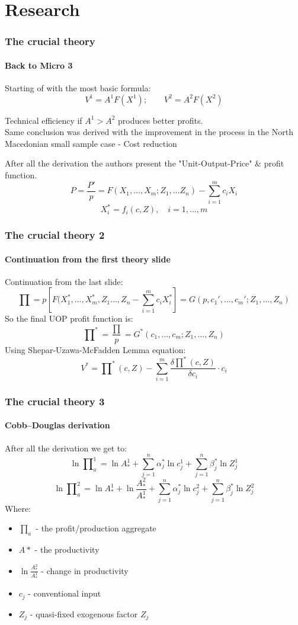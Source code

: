 \documentclass{beamer} %
\theoremstyle{definition}
\begin{document}
	\section{Research}
	\begin{frame}[fragile]
		\frametitle{The crucial theory}
		\framesubtitle{Back to Micro 3}
		Starting of with the most basic formula:
		$$ V^1 = A^1F(X^1); \qquad V^2 = A^2F(X^2) $$
		\begin{center}
			Technical efficiency if $A^1 > A^2$ produces better profits.\\
			 {\tiny Same conclusion was derived with the improvement in the process in the North Macedonian small sample case - Cost reduction}
		\end{center}
		After all the derivation the authors present the "Unit-Output-Price" \& profit function.
		$$ P = \frac{P'}{p} = F(X_1,\hdots, X_m; Z_1, \hdots Z_n) - \sum_{i=1}^{m} c_iX_i $$ 
		$$ X_i^{*} = f_i(c,Z), \quad i = 1, \hdots, m$$
		
		
	\end{frame}
	
	\begin{frame}[fragile]
		\frametitle{The crucial theory 2 }
		\framesubtitle{Continuation from the first theory slide}
		Continuation from the last slide:
		$$ \prod = p\left[F(X_1^*, \hdots , X_m^*, Z_1 \hdots, Z_n - \sum_{i=1}^{m} c_iX_i^*  \right] = G(p,c_1', \hdots, c_m';Z_1, \hdots, Z_n) $$
		So the final UOP profit function is:
		$$ \prod\nolimits^* = \frac{\prod}{p} = G^*(c_1, \hdots, c_m; Z_1, \hdots, Z_n)$$
		Using Shepar-Uzawa-McFadden Lemma equation:
		$$ V^* = \prod\nolimits^*(c,Z) - \sum_{i=1}^{m} \frac{\delta \prod\nolimits^*(c,Z)}{\delta c_i} \cdot c_i$$
		
	\end{frame}
	
	\begin{frame}[fragile]
		\frametitle{The crucial theory 3 }
		\framesubtitle{Cobb–Douglas derivation}
		After all the derivation we get to:
		\begin{equation*}
			\ln \prod\nolimits_a^1 = \ln A^1_* + \sum_{j=1}^n \alpha_j^* \ln c_j^1 + \sum_{j=1}^n \beta_j^* \ln Z_j^1
		\end{equation*}
		\begin{equation*}
			\ln \prod\nolimits_a^2 = \ln A^1_* +  \ln \frac{A_*^2}{A_*^1} + \sum_{j=1}^n \alpha_j^* \ln c_j^2 + \sum_{j=1}^n \beta_j^* \ln Z_j^2
		\end{equation*}
		Where:
		\begin{itemize}
			\item $\prod\nolimits_a$ - the profit/production aggregate
			\item $A*$ - the productivity
			\item $\ln \frac{A_*^2}{A_*^1}$ - change in productivity
			\item $c_j$ - conventional input
			\item $Z_j$ - quasi-fixed exogenous factor $Z_j$
		\end{itemize}
	\end{frame}
	
\end{document}
